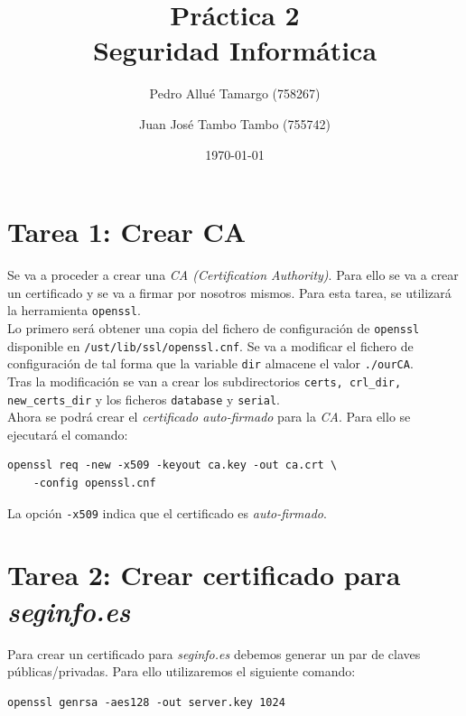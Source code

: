 \documentclass[10pt,a4paper]{article}
\begin{document}
\begin{titlepage}
\title{\textbf{\Huge{Práctica 2}\\
	\large{Seguridad Informática}
}}
\author{
	Pedro Allué Tamargo (758267)
	\and
	Juan José Tambo Tambo (755742)
}
\date{\today}
\clearpage\maketitle
\thispagestyle{empty}
\tableofcontents
\end{titlepage}

\section{Tarea 1: Crear CA}

Se va a proceder a crear una \emph{CA (Certification Authority)}. Para ello se va a crear un certificado y se va a firmar por nosotros mismos. Para esta tarea, se utilizará la herramienta \texttt{openssl}.\\
Lo primero será obtener una copia del fichero de configuración de \texttt{openssl} disponible en \texttt{/ust/lib/ssl/openssl.cnf}. Se va a modificar el fichero de configuración de tal forma que la variable \texttt{dir} almacene el valor \texttt{./ourCA}.\\
Tras la modificación se van a crear los subdirectorios \texttt{certs, crl\_{}dir, new\_{}certs\_{}dir} y los ficheros \texttt{database} y \texttt{serial}.\\

Ahora se podrá crear el \emph{certificado auto-firmado} para la \emph{CA}. Para ello se ejecutará el comando:

\begin{lstlisting}
openssl req -new -x509 -keyout ca.key -out ca.crt \
	-config openssl.cnf
\end{lstlisting}

La opción \texttt{-x509} indica que el certificado es \emph{auto-firmado}.


\section{Tarea 2: Crear certificado para \emph{seginfo.es}}

Para crear un certificado para \emph{seginfo.es} debemos generar un par de claves públicas/privadas. Para ello utilizaremos el siguiente comando:

\begin{lstlisting}
openssl genrsa -aes128 -out server.key 1024
\end{lstlisting}
\end{document}
